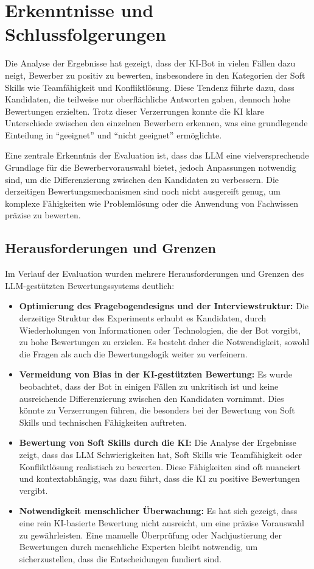 \section{Erkenntnisse und Schlussfolgerungen}

Die Analyse der Ergebnisse hat gezeigt, dass der \acs{KI}-Bot in vielen Fällen dazu neigt, Bewerber zu positiv zu bewerten, insbesondere in den Kategorien der Soft Skills wie Teamfähigkeit und Konfliktlösung. Diese Tendenz führte dazu, dass Kandidaten, die teilweise nur oberflächliche Antworten gaben, dennoch hohe Bewertungen erzielten. Trotz dieser Verzerrungen konnte die \acs{KI} klare Unterschiede zwischen den einzelnen Bewerbern erkennen, was eine grundlegende Einteilung in \enquote{geeignet} und \enquote{nicht geeignet} ermöglichte.

Eine zentrale Erkenntnis der Evaluation ist, dass das \acs{LLM} eine vielversprechende Grundlage für die Bewerbervorauswahl bietet, jedoch Anpassungen notwendig sind, um die Differenzierung zwischen den Kandidaten zu verbessern. Die derzeitigen Bewertungsmechanismen sind noch nicht ausgereift genug, um komplexe Fähigkeiten wie Problemlösung oder die Anwendung von Fachwissen präzise zu bewerten.

\subsection{Herausforderungen und Grenzen}

Im Verlauf der Evaluation wurden mehrere Herausforderungen und Grenzen des \acs{LLM}-gestützten Bewertungssystems deutlich:

\begin{itemize}
    \item \textbf{Optimierung des Fragebogendesigns und der Interviewstruktur:} Die derzeitige Struktur des Experiments erlaubt es Kandidaten, durch Wiederholungen von Informationen oder Technologien, die der Bot vorgibt, zu hohe Bewertungen zu erzielen. Es besteht daher die Notwendigkeit, sowohl die Fragen als auch die Bewertungslogik weiter zu verfeinern.
    \item \textbf{Vermeidung von Bias in der \acs{KI}-gestützten Bewertung:} Es wurde beobachtet, dass der Bot in einigen Fällen zu unkritisch ist und keine ausreichende Differenzierung zwischen den Kandidaten vornimmt. Dies könnte zu Verzerrungen führen, die besonders bei der Bewertung von Soft Skills und technischen Fähigkeiten auftreten.
    \item \textbf{Bewertung von Soft Skills durch die \acs{KI}:} Die Analyse der Ergebnisse zeigt, dass das \acs{LLM} Schwierigkeiten hat, Soft Skills wie Teamfähigkeit oder Konfliktlösung realistisch zu bewerten. Diese Fähigkeiten sind oft nuanciert und kontextabhängig, was dazu führt, dass die \acs{KI} zu positive Bewertungen vergibt.
    \item \textbf{Notwendigkeit menschlicher Überwachung:} Es hat sich gezeigt, dass eine rein \acs{KI}-basierte Bewertung nicht ausreicht, um eine präzise Vorauswahl zu gewährleisten. Eine manuelle Überprüfung oder Nachjustierung der Bewertungen durch menschliche Experten bleibt notwendig, um sicherzustellen, dass die Entscheidungen fundiert sind.
\end{itemize}

